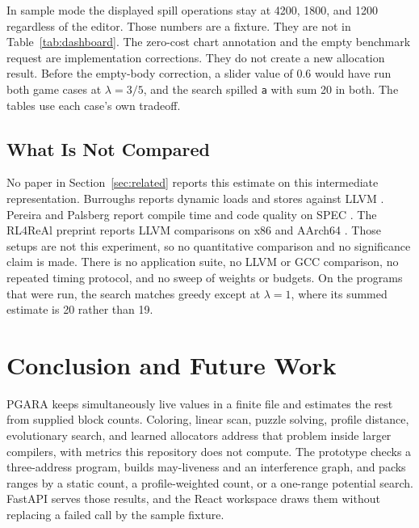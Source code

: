 \documentclass{ieeeaccess}
\begin{document}

In sample mode the displayed spill operations stay at 4200, 1800, and 1200 regardless of the editor.
Those numbers are a fixture.
They are not in Table~\ref{tab:dashboard}.
The zero-cost chart annotation and the empty benchmark request are implementation corrections.
They do not create a new allocation result.
Before the empty-body correction, a slider value of 0.6 would have run both game cases at $\lambda = 3/5$, and the search spilled \texttt{a} with sum 20 in both.
The tables use each case's own tradeoff.

\subsection{What Is Not Compared}
\label{sec:notcompared}
No paper in Section~\ref{sec:related} reports this estimate on this intermediate representation.
Burroughs reports dynamic loads and stores against LLVM \cite{burroughs2016}.
Pereira and Palsberg report compile time and code quality on SPEC \cite{pereira2008}.
The RL4ReAl preprint reports LLVM comparisons on x86 and AArch64 \cite{venkatakeerthy2022}.
Those setups are not this experiment, so no quantitative comparison and no significance claim is made.
There is no application suite, no LLVM or GCC comparison, no repeated timing protocol, and no sweep of weights or budgets.
On the programs that were run, the search matches greedy except at $\lambda = 1$, where its summed estimate is 20 rather than 19.

\section{Conclusion and Future Work}
\label{sec:conclusion}
PGARA keeps simultaneously live values in a finite file and estimates the rest from supplied block counts.
Coloring, linear scan, puzzle solving, profile distance, evolutionary search, and learned allocators address that problem inside larger compilers, with metrics this repository does not compute.
The prototype checks a three-address program, builds may-liveness and an interference graph, and packs ranges by a static count, a profile-weighted count, or a one-range potential search.
FastAPI serves those results, and the React workspace draws them without replacing a failed call by the sample fixture.
\end{document}
